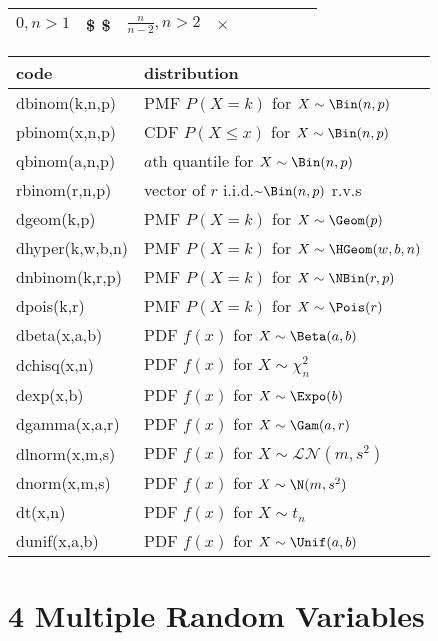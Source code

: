 \documentclass[]{tufte-book}
\begin{document}
\begin{longtable}[]{@{}lllllllll@{}}
\begin{minipage}[t]{0.08\columnwidth}
\(0,n>1\)\strut
\end{minipage} & \begin{minipage}[t]{0.08\columnwidth}\raggedright
\$ \$\strut
\end{minipage} & \begin{minipage}[t]{0.08\columnwidth}\raggedright
\(\frac{n}{n-2},n>2\)\strut
\end{minipage} & \begin{minipage}[t]{0.08\columnwidth}\raggedright
\(\times\)\strut
\end{minipage} & \begin{minipage}[t]{0.08\columnwidth}\raggedright
\strut
\end{minipage} & \begin{minipage}[t]{0.08\columnwidth}\raggedright
\strut
\end{minipage}\tabularnewline
\bottomrule
\end{longtable}

\begin{longtable}[]{@{}ll@{}}
\toprule
code & distribution\tabularnewline
\midrule
\endhead
dbinom(k,n,p) & PMF \(P(X=k)\) for \(X \sim \Bin(n,p)\)\tabularnewline
pbinom(x,n,p) & CDF \(P(X \leq x)\) for
\(X \sim \Bin(n,p)\)\tabularnewline
qbinom(a,n,p) & \(a\)th quantile for \(X \sim \Bin(n,p)\)\tabularnewline
rbinom(r,n,p) & vector of \(r\) i.i.d.\textasciitilde{}\(\Bin(n,p)\)
r.v.s\tabularnewline
dgeom(k,p) & PMF \(P(X=k)\) for \(X \sim \Geom(p)\)\tabularnewline
dhyper(k,w,b,n) & PMF \(P(X=k)\) for
\(X \sim \HGeom(w,b,n)\)\tabularnewline
dnbinom(k,r,p) & PMF \(P(X=k)\) for \(X \sim \NBin(r,p)\)\tabularnewline
dpois(k,r) & PMF \(P(X=k)\) for \(X \sim \Pois(r)\)\tabularnewline
dbeta(x,a,b) & PDF \(f(x)\) for \(X \sim \Beta(a,b)\)\tabularnewline
dchisq(x,n) & PDF \(f(x)\) for \(X \sim \chi^2_n\)\tabularnewline
dexp(x,b) & PDF \(f(x)\) for \(X \sim \Expo(b)\)\tabularnewline
dgamma(x,a,r) & PDF \(f(x)\) for \(X \sim \Gam(a,r)\)\tabularnewline
dlnorm(x,m,s) & PDF \(f(x)\) for
\(X \sim \mathcal{LN}(m,s^2)\)\tabularnewline
dnorm(x,m,s) & PDF \(f(x)\) for \(X \sim \N(m,s^2)\)\tabularnewline
dt(x,n) & PDF \(f(x)\) for \(X \sim t_n\)\tabularnewline
dunif(x,a,b) & PDF \(f(x)\) for \(X \sim \Unif(a,b)\)\tabularnewline
\bottomrule
\end{longtable}

\hypertarget{multiple-random-variables}{%
\section{4 Multiple Random Variables}\label{multiple-random-variables}}
\end{document}
